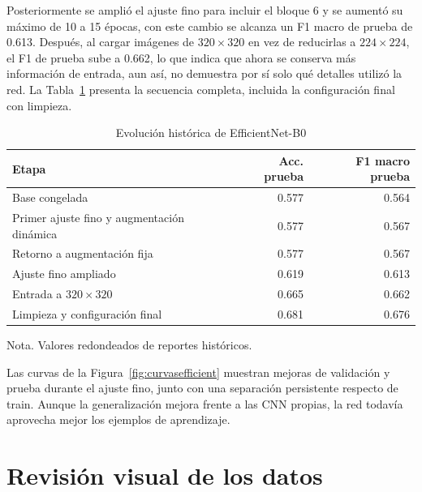 \documentclass[conference]{IEEEtran}
\begin{document}
Posteriormente se amplió el ajuste fino para incluir el bloque 6 y se aumentó su máximo de 10 a 15 épocas, con este cambio se alcanza un F1 macro de prueba de 0.613. Después, al cargar imágenes de $320\times320$ en vez de reducirlas a $224\times224$, el F1 de prueba sube a 0.662, lo que indica que ahora se conserva más información de entrada, aun así, no demuestra por sí solo qué detalles utilizó la red. La Tabla~\ref{tab:evolucionefficient} presenta la secuencia completa, incluida la configuración final con limpieza.

\begin{table}[!htbp]
\caption{Evolución histórica de EfficientNet-B0}
\label{tab:evolucionefficient}
\centering
\scriptsize
\setlength{\tabcolsep}{3pt}
\begin{tabularx}{\columnwidth}{Xrr}
\toprule
Etapa & Acc. prueba & F1 macro prueba \\
\midrule
Base congelada & 0.577 & 0.564 \\
Primer ajuste fino y augmentación dinámica & 0.577 & 0.567 \\
Retorno a augmentación fija & 0.577 & 0.567 \\
Ajuste fino ampliado & 0.619 & 0.613 \\
Entrada a $320\times320$ & 0.665 & 0.662 \\
Limpieza y configuración final & 0.681 & 0.676 \\
\bottomrule
\end{tabularx}
\par\smallskip
\begin{minipage}{\columnwidth}\scriptsize
Nota. Valores redondeados de reportes históricos.
\end{minipage}
\end{table}


Las curvas de la Figura~\ref{fig:curvasefficient} muestran mejoras de validación y prueba durante el ajuste fino, junto con una separación persistente respecto de train. Aunque la generalización mejora frente a las CNN propias, la red todavía aprovecha mejor los ejemplos de aprendizaje.

\FloatBarrier
\section{Revisión visual de los datos}
\end{document}

